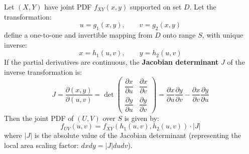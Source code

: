 \documentclass[12pt,a4paper]{article}
\begin{document}
\begin{tcolorbox}[defbox, title={\textbf{Theorem: Bivariate Jacobian Transformation}}]
Let $(X, Y)$ have joint PDF $f_{XY}(x, y)$ supported on set $D$. Let the transformation:
\begin{equation}
  u = g_1(x, y), \qquad v = g_2(x, y)
\end{equation}
define a one-to-one and invertible mapping from $D$ onto range $S$, with unique inverse:
\begin{equation}
  x = h_1(u, v), \qquad y = h_2(u, v)
\end{equation}
If the partial derivatives are continuous, the \textbf{Jacobian determinant} $J$ of the inverse transformation is:
\begin{equation}
  J = \frac{\partial(x, y)}{\partial(u, v)} = \det \begin{pmatrix} \dfrac{\partial x}{\partial u} & \dfrac{\partial x}{\partial v} \\[6pt] \dfrac{\partial y}{\partial u} & \dfrac{\partial y}{\partial v} \end{pmatrix} = \frac{\partial x}{\partial u}\frac{\partial y}{\partial v} - \frac{\partial x}{\partial v}\frac{\partial y}{\partial u}
\end{equation}
Then the joint PDF of $(U, V)$ over $S$ is given by:
\begin{equation}
  f_{UV}(u, v) = f_{XY}\left(h_1(u, v), h_2(u, v)\right) \cdot |J|
\end{equation}
where $|J|$ is the absolute value of the Jacobian determinant (representing the local area scaling factor: $dx dy = |J| du dv$).
\end{tcolorbox}
\end{document}
